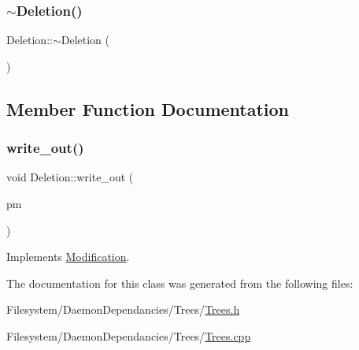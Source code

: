 \mbox{\label{class_deletion_ad56d54e1ab5d4d2a875b6093c05ba1d8}} 
\subsubsection{\texorpdfstring{$\sim$\+Deletion()}{~Deletion()}}
{\footnotesize\ttfamily Deletion\+::$\sim$\+Deletion (\begin{DoxyParamCaption}{ }\end{DoxyParamCaption})}



\subsection{Member Function Documentation}
\mbox{\label{class_deletion_ac5bdb21c4a8dbc8afea9910435e509a8}} 
\subsubsection{\texorpdfstring{write\+\_\+out()}{write\_out()}}
{\footnotesize\ttfamily void Deletion\+::write\+\_\+out (\begin{DoxyParamCaption}\item[{\mbox{\hyperlink{class_partition_manager}{Partition\+Manager}} $\ast$}]{pm }\end{DoxyParamCaption})\hspace{0.3cm}{\ttfamily [virtual]}}



Implements \mbox{\hyperlink{class_modification_a50d1fd809524902d2a1e78d02f4be1dc}{Modification}}.



The documentation for this class was generated from the following files\+:\begin{DoxyCompactItemize}
\item 
Filesystem/\+Daemon\+Dependancies/\+Trees/\mbox{\hyperlink{_trees_8h}{Trees.\+h}}\item 
Filesystem/\+Daemon\+Dependancies/\+Trees/\mbox{\hyperlink{_trees_8cpp}{Trees.\+cpp}}\end{DoxyCompactItemize}
